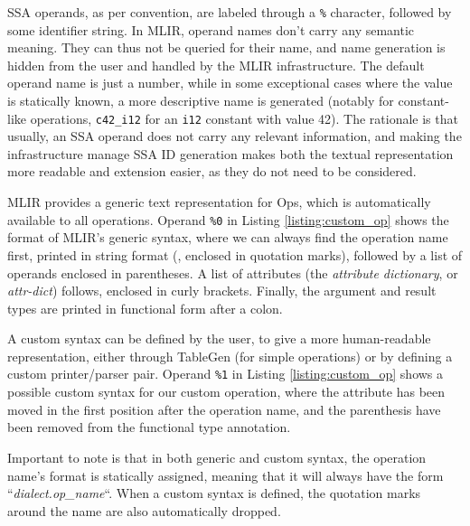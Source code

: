 SSA operands, as per convention, are labeled through a \texttt{\%} character, followed by some identifier string. In MLIR, operand names don’t carry any semantic meaning. They can thus not be queried for their name, and name generation is hidden from the user and handled by the MLIR infrastructure. The default operand name is just a number, while in some exceptional cases where the value is statically known, a more descriptive name is generated (notably for constant-like operations, \eg \texttt{c42\_i12} for an \texttt{i12} constant with value 42). The rationale is that usually, an SSA operand does not carry any relevant information, and making the infrastructure manage SSA ID generation makes both the textual representation more readable and extension easier, as they do not need to be considered.

MLIR provides a generic text representation for Ops, which is automatically available to all operations. Operand \texttt{\%0} in Listing \ref{listing:custom_op} shows the format of MLIR's generic syntax, where we can always find the operation name first, printed in string format (\ie, enclosed in quotation marks), followed by a list of operands enclosed in parentheses. A list of attributes (the \textit{attribute dictionary}, or \textit{attr-dict}) follows, enclosed in curly brackets. Finally, the argument and result types are printed in functional form after a colon.

A custom syntax can be defined by the user, to give a more human-readable representation, either through TableGen (for simple operations) or by defining a custom printer/parser pair. Operand \texttt{\%1} in Listing \ref{listing:custom_op} shows a possible custom syntax for our custom operation, where the attribute has been moved in the first position after the operation name, and the parenthesis have been removed from the functional type annotation.

Important to note is that in both generic and custom syntax, the operation name's format is statically assigned, meaning that it will always have the form “\textit{dialect.op\_name}“. When a custom syntax is defined, the quotation marks around the name are also automatically dropped.



